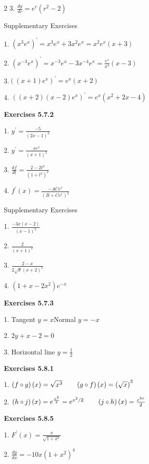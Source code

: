\begin {multicols}{2}
3. $\frac{d y}{d r} =e^{r} \left (r^{2} -2\right )$ 

Supplementary Exercises 

1. $\left (x^{3} e^{x}\right )^{ \prime } =x^{3} e^{x} +3 x^{2} e^{x} =x^{2} e^{x} \left (x +3\right )$ 

2. $\left (x^{ -3} e^{x}\right )^{ \prime } =x^{ -3} e^{x} -3 x^{ -4} e^{x} =\frac{e^{x}}{x^{4}} \left (x -3\right )$ 

3.$\left (\left (x +1\right ) e^{x}\right )^{ \prime } =e^{x} \left (x +2\right )$ 

4. $\left (\left (x +2\right ) \left (x -2\right ) e^{x}\right )^{ \prime } =e^{x} \left (x^{2} +2 x -4\right )$ 

\textbf{Exercises 5.7.2} 

1. $y^{ \prime } =\frac{ -5}{\left (2 x -1\right )^{2}}$ 

2. $y^{ \prime } =\frac{x e^{x}}{\left (x +1\right )^{2}}$ 

3. $\frac{d f}{d t} =\frac{2 -2 t^{2}}{\left (1 +t^{2}\right )^{2}}$ 

4. $f^{ \prime } \left (x\right ) =\frac{ -A C e^{x}}{\left (B +C e^{x}\right )^{2}}$ 

Supplementary Exercises 

1. $\frac{ -3 x \left (x -2\right )}{\left (x -1\right )^{2}}$ 

2. $\frac{2}{\left (x +1\right )^{2}}$ 

3. $\frac{2 -x}{2 \sqrt{x} \left (x +2\right )^{2}}$ 

4. $\left (1 +x -2 x^{2}\right ) e^{ -x}$ 

\textbf{Exercises 5.7.3} 

1. Tangent $y =x$\qquad Normal $y = -x$ 

2. $2 y +x -2 =0$ 

3. Horizontal line $y =\frac{1}{2}$ 

\textbf{Exercises 5.8.1} 

1. $\left (f \circ g\right ) \left (x\right ) =\sqrt{x^{3}}\text{\quad \quad }\left (g \circ f\right ) \left (x\right ) =\left (\sqrt{x}\right )^{3}$ 

2. $\left (h \circ j\right ) \left (x\right ) =e^{\frac{x^{2}}{2}} =e^{x^{2}/2}\text{\quad \quad }\left (j \circ h\right ) \left (x\right ) =\frac{e^{2 x}}{2}$ 

\textbf{Exercises 5.8.5} 

1. $F^{ \prime } (x) =\frac{x}{\sqrt{1 +x^{2}}}$ 

2. $\frac{d y}{d x} = -10 x \left (1 +x^{2}\right )^{4}$ 


\end{multicols}
